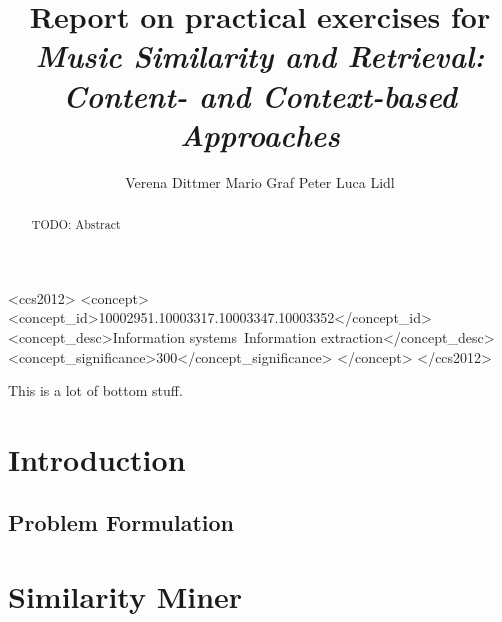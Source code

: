 \documentclass[prodmode,acmtecs]{acmsmall} %
\begin{document}

\title{Report on practical exercises for \emph{Music Similarity and Retrieval: Content- and Context-based Approaches}}
\author{
Verena Dittmer
Mario Graf
Peter Luca Lidl
}

\begin{abstract}
TODO: Abstract
\end{abstract}

%
%
\begin{CCSXML}
<ccs2012>
<concept>
<concept_id>10002951.10003317.10003347.10003352</concept_id>
<concept_desc>Information systems~Information extraction</concept_desc>
<concept_significance>300</concept_significance>
</concept>
</ccs2012>
\end{CCSXML}


%
%



\begin{bottomstuff}
This is a lot of bottom stuff.
\end{bottomstuff}

\maketitle


\section{Introduction}

\subsection{Problem Formulation}

\section{Similarity Miner}
\end{document}
